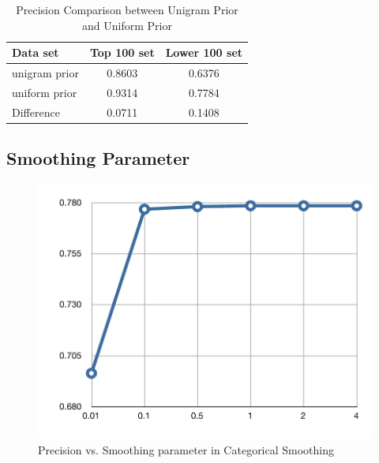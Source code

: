\begin{table}[t]
\caption{Precision Comparison between Unigram Prior and Uniform Prior}
\label{tab-prior-comparison}
\vskip 0.15in
\begin{center}
\begin{small}
\begin{sc}
\begin{tabular}{l|cc}
\hline
\abovespace \belowspace
Data set & Top 100 set & Lower 100 set \\
\hline
\abovespace
unigram prior & 0.8603 & 0.6376 \\
\belowspace
uniform prior & 0.9314 & 0.7784 \\
\hline
\abovespace
\belowspace
Difference & 0.0711 & 0.1408 \\
\hline
\end{tabular}
\end{sc}
\end{small}
\end{center}
\vskip -0.1in
\end{table}

\subsection{Smoothing Parameter}

\begin{figure}[ht]
\vskip 0.2in
\begin{center}
\centerline{\includegraphics[width=\columnwidth]{pvsalpha}}
\caption{Precision vs. Smoothing parameter in Categorical Smoothing}
\label{fig-p-vs-alpha}
\end{center}
\vskip -0.2in
\end{figure}

